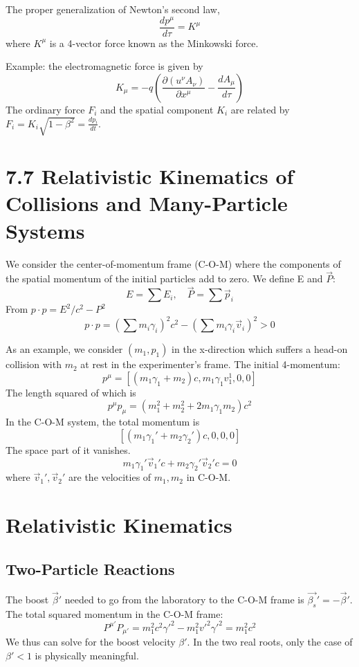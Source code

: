 \documentclass{article}
\begin{document}
    The proper generalization of Newton's second law,
    $$ \frac{dp^\mu}{d\tau} = K^\mu $$
    where $K^\mu$ is a 4-vector force known as the Minkowski force.
    
    Example: the electromagnetic force is given by
    $$ K_\mu = -q \left( \frac{\partial (u^\nu A_\nu)}{\partial x^\mu} - \frac{d A_\mu}{d\tau} \right) $$
    The ordinary force $F_i$ and the spatial component $K_i$ are related by $F_i = K_i \sqrt{1- \beta^2} = \frac{dp_i}{dt}$.
    
    \section*{7.7 Relativistic Kinematics of Collisions and Many-Particle Systems}
    
    We consider the center-of-momentum frame (C-O-M) where the components of the spatial momentum of the initial particles add to zero. We define E and $\vec{P}$:
    $$ E = \sum E_i, \quad \vec{P} = \sum \vec{p}_i $$
    From $p \cdot p = E^2/c^2 - P^2$
    $$ p \cdot p = \left( \sum m_i \gamma_i \right)^2 c^2 - \left( \sum m_i \gamma_i \vec{v}_i \right)^2 > 0 $$
    
    As an example, we consider $(m_1, p_1)$ in the x-direction which suffers a head-on collision with $m_2$ at rest in the experimenter's frame.
    The initial 4-momentum:
    $$ p^\mu = [(m_1 \gamma_1 + m_2)c, m_1 \gamma_1 v_1^1, 0, 0] $$
    The length squared of which is
    $$ p^\mu p_\mu = (m_1^2 + m_2^2 + 2m_1 \gamma_1 m_2)c^2 $$
    In the C-O-M system, the total momentum is
    $$ [ (m_1 \gamma_1' + m_2 \gamma_2')c, 0, 0, 0 ] $$
    The space part of it vanishes.
    $$ m_1 \gamma_1' \vec{v}_1' c + m_2 \gamma_2' \vec{v}_2' c = 0 $$
    where $\vec{v}_1', \vec{v}_2'$ are the velocities of $m_1, m_2$ in C-O-M.
    \section*{Relativistic Kinematics}
    
    \subsection*{Two-Particle Reactions}
    The boost $\vec{\beta}'$ needed to go from the laboratory to the C-O-M frame is $\vec{\beta_s}' = -\vec{\beta}'$.
    The total squared momentum in the C-O-M frame:
    $$ P^{\mu'} P_{\mu'} = m_1^2 c^2 \gamma'^2 - m_1^2 v'^2 \gamma'^2 = m_1^2 c^2 $$
    We thus can solve for the boost velocity $\beta'$. In the two real roots, only the case of $\beta' < 1$ is physically meaningful.
    
\end{document}
